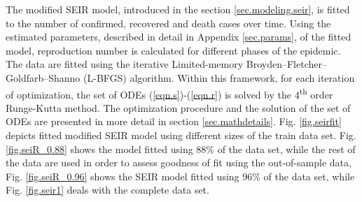 \documentclass[conference]{IEEEtran}
\begin{document}
The modified SEIR model, introduced in the section \ref{sec.modeling.seir}, is fitted to the number of confirmed, recovered and death cases over time. Using the estimated parameters, described in detail in Appendix \ref{sec.params}, of the fitted model, reproduction number is calculated for different phases of the epidemic. The data are fitted using the iterative Limited-memory Broyden–Fletcher–Goldfarb–Shanno (L-BFGS) algorithm. Within this framework, for each iteration of optimization, the set of ODEs (\ref{eqn.s})-(\ref{eqn.r}) is solved by the 4\textsuperscript{th} order Runge-Kutta method. The optimization procedure and the solution of the set of ODEs are presented in more detail in section \ref{sec.mathdetails}. Fig. \ref{fig.seirfit} depicts fitted modified SEIR model using different sizes of the train data set. Fig. \ref{fig.seiR_0.88} shows the model fitted using 88\% of the data set, while the rest of the data are used in order to assess goodness of fit using the out-of-sample data, Fig. \ref{fig.seiR_0.96} shows the SEIR model fitted using 96\% of the data set, while Fig. \ref{fig.seir1} deals with the complete data set.
\end{document}
